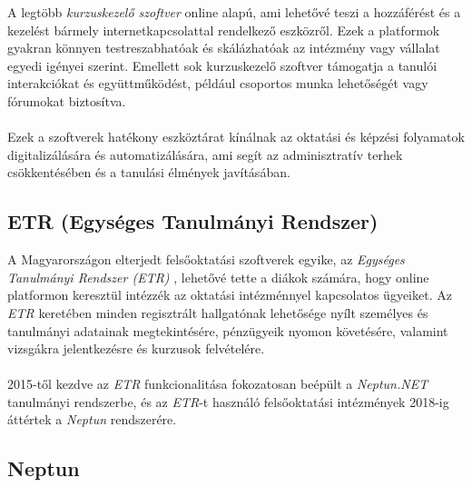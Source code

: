 A legtöbb \textit{kurzuskezelő szoftver} online alapú, ami lehetővé teszi a hozzáférést és a kezelést bármely internetkapcsolattal rendelkező eszközről. Ezek a platformok gyakran könnyen testreszabhatóak és skálázhatóak az intézmény vagy vállalat egyedi igényei szerint. Emellett sok kurzuskezelő szoftver támogatja a tanulói interakciókat és együttműködést, például csoportos munka lehetőségét vagy fórumokat biztosítva.\\
\\
Ezek a szoftverek hatékony eszköztárat kínálnak az oktatási és képzési folyamatok digitalizálására és automatizálására, ami segít az adminisztratív terhek csökkentésében és a tanulási élmények javításában.

\subsection{\textbf{ETR (Egységes Tanulmányi Rendszer)}}

A Magyarországon elterjedt felsőoktatási szoftverek egyike, az \textit{Egységes Tanulmányi Rendszer (ETR)} \cite{etr}, lehetővé tette a diákok számára, hogy online platformon keresztül intézzék az oktatási intézménnyel kapcsolatos ügyeiket. Az \textit{ETR} keretében minden regisztrált hallgatónak lehetősége nyílt személyes és tanulmányi adatainak megtekintésére, pénzügyeik nyomon követésére, valamint vizsgákra jelentkezésre és kurzusok felvételére.\\
\\
2015-től kezdve az \textit{ETR} funkcionalitása fokozatosan beépült a \textit{Neptun.NET} \cite{neptun} tanulmányi rendszerbe, és az \textit{ETR}-t használó felsőoktatási intézmények 2018-ig áttértek a \textit{Neptun} rendszerére.

\subsection{\textbf{Neptun}}

